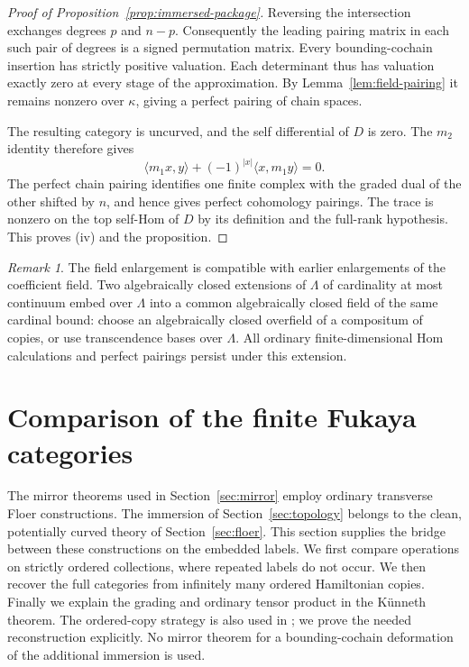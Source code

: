 \documentclass[11pt]{article}
\numberwithin{equation}{section}
\theoremstyle{definition}
\theoremstyle{remark}
\newtheorem{remark}[theorem]{Remark}
\begin{document}
\begin{proof}[Proof of Proposition~\ref{prop:immersed-package}]
Reversing the intersection exchanges degrees $p$ and $n-p$.
Consequently the leading pairing matrix in each such pair of
degrees is a signed permutation matrix.  Every bounding-cochain
insertion has strictly positive valuation.  Each determinant thus
has valuation exactly zero at every stage of the approximation.
By Lemma~\ref{lem:field-pairing} it remains nonzero over $\kappa$,
giving a perfect pairing of chain spaces.

The resulting category is uncurved, and the self differential of
$D$ is zero.  The $m_2$ identity therefore gives
\[
 \langle m_1x,y\rangle+(-1)^{|x|}
 \langle x,m_1y\rangle=0.
\]
The perfect chain pairing identifies one finite complex with the
graded dual of the other shifted by $n$, and hence gives perfect
cohomology pairings.  The trace is nonzero on the top self-Hom of
$D$ by its definition and the full-rank hypothesis.  This proves
(iv) and the proposition.
\end{proof}

\begin{remark}
The field enlargement is compatible with earlier enlargements of the
coefficient field.  Two algebraically closed extensions of $\Lambda$
of cardinality at most continuum embed over $\Lambda$ into a common
algebraically closed field of the same cardinal bound: choose an
algebraically closed overfield of a compositum of copies, or use
transcendence bases over $\Lambda$.  All ordinary finite-dimensional
Hom calculations and perfect pairings persist under this extension.
\end{remark}


\section{Comparison of the finite Fukaya categories}\label{sec:comparison}

The mirror theorems used in Section~\ref{sec:mirror} employ ordinary
transverse Floer constructions.  The immersion of Section~\ref{sec:topology} belongs
to the clean, potentially curved theory of Section~\ref{sec:floer}.
This section supplies the bridge between these constructions on the
embedded labels.  We first compare operations on strictly ordered
collections, where repeated labels do not occur.  We then recover the
full categories from infinitely many ordered Hamiltonian copies.
Finally we explain the grading and ordinary tensor product in the
K\"unneth theorem.  The ordered-copy strategy is also used in
\cite[Section~10.2]{W}; we prove the needed reconstruction explicitly.
No mirror theorem for a bounding-cochain deformation
of the additional immersion is used.
\end{document}
